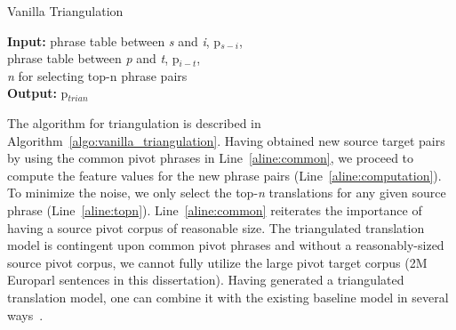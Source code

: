 \begin{algorithm}
\caption{Vanilla Triangulation}
\label{algo:vanilla_triangulation}

\textbf{Input:} phrase table between \emph{s} and \emph{i}, p$_{s-i}$, \\
 phrase table between \emph{p} and \emph{t}, p$_{i-t}$,  \\
 \emph{n} for selecting top-n phrase pairs \\
\textbf{Output:} p$_{trian}$
\begin{algorithmic}[l]
 \label{aline:common}

         \label{aline:computation}
        \ENDFOR
         \label{aline:topn}
        \ENDIF
        \ENDFOR


\end{algorithmic}

\end{algorithm}

The algorithm for triangulation is described in Algorithm~\ref{algo:vanilla_triangulation}. Having obtained new source target pairs by using the common pivot phrases in Line~\ref{aline:common}, we proceed to compute the feature values for the new phrase pairs (Line~\ref{aline:computation}). To minimize the noise, we only select the top-\emph{n} translations for any given source phrase (Line~\ref{aline:topn}). Line~\ref{aline:common} reiterates the importance of having a source pivot corpus of reasonable size. The triangulated translation model is contingent upon common pivot phrases and without a reasonably-sized source pivot corpus, we cannot fully utilize the large pivot target corpus (2M Europarl sentences in this dissertation). Having generated a triangulated translation model, one can combine it with the existing baseline model in several ways~\cite{Bertoldi:08, Nakov:12, Cohn:07}. 

